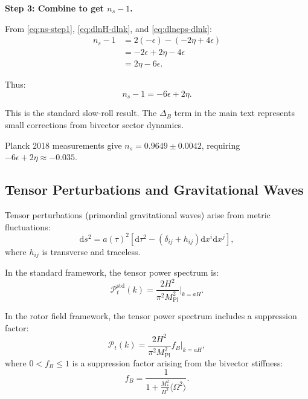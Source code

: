 \documentclass[11pt,a4paper]{article}
\numberwithin{equation}{section}
\theoremstyle{plain}
\theoremstyle{definition}
\theoremstyle{remark}
\newcommand{\dd}{\mathrm{d}}
\begin{document}
\textbf{Step 3: Combine to get $n_s - 1$.}

From \eqref{eq:ns-step1}, \eqref{eq:dlnH-dlnk}, and \eqref{eq:dlneps-dlnk}:
\begin{align}
n_s - 1 &= 2(-\epsilon) - (-2\eta + 4\epsilon)\\
&= -2\epsilon + 2\eta - 4\epsilon\\
&= 2\eta - 6\epsilon.
\end{align}

Thus:
\begin{equation}
n_s - 1 = -6\epsilon + 2\eta.
\label{eq:spectral-index}
\end{equation}

This is the standard slow-roll result. The $\Delta_B$ term in the main text represents small corrections from bivector sector dynamics.

Planck 2018 measurements give $n_s = 0.9649 \pm 0.0042$, requiring $-6\epsilon + 2\eta \approx -0.035$.

\subsection{Tensor Perturbations and Gravitational Waves}

Tensor perturbations (primordial gravitational waves) arise from metric fluctuations:
\begin{equation}
\dd s^2 = a(\tau)^2\left[\dd\tau^2 - (\delta_{ij} + h_{ij})\dd x^i\dd x^j\right],
\end{equation}
where $h_{ij}$ is transverse and traceless.

In the standard framework, the tensor power spectrum is:
\begin{equation}
\mathcal{P}_t^{\text{std}}(k) = \frac{2H^2}{\pi^2 M_{\mathrm{Pl}}^2}\Bigg|_{k=aH}.
\end{equation}

In the rotor field framework, the tensor power spectrum includes a suppression factor:
\begin{equation}
\mathcal{P}_t(k) = \frac{2H^2}{\pi^2 M_{\mathrm{Pl}}^2}f_B\Bigg|_{k=aH},
\label{eq:tensor-power}
\end{equation}
where $0 < f_B \leq 1$ is a suppression factor arising from the bivector stiffness:
\begin{equation}
f_B = \frac{1}{1 + \frac{M_*^2}{H^2}\langle \Omega^2 \rangle}.
\end{equation}
\end{document}
